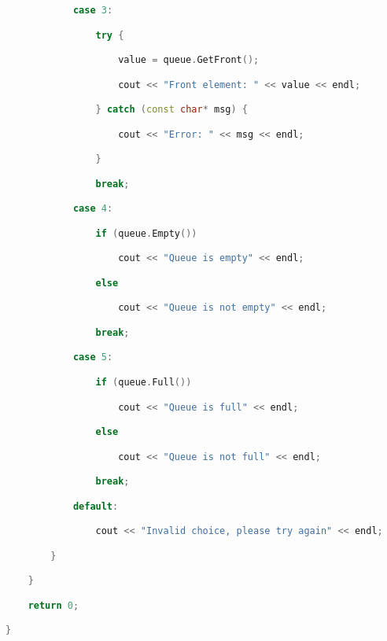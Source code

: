 \begin{lstlisting}[language=C++]
            case 3:

                try {

                    value = queue.GetFront();

                    cout << "Front element: " << value << endl;

                } catch (const char* msg) {

                    cout << "Error: " << msg << endl;

                }

                break;

            case 4:

                if (queue.Empty())

                    cout << "Queue is empty" << endl;

                else

                    cout << "Queue is not empty" << endl;

                break;

            case 5:

                if (queue.Full())

                    cout << "Queue is full" << endl;

                else

                    cout << "Queue is not full" << endl;

                break;

            default:

                cout << "Invalid choice, please try again" << endl;

        }

    }

    return 0;

}
\end{lstlisting}